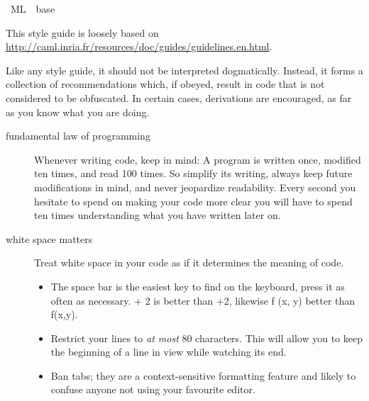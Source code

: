 %
\begin{isabellebody}%
\def\isabellecontext{ML}%
%
\isadelimtheory
\isanewline
\isanewline
\isanewline
%
\endisadelimtheory
%
\isatagtheory
{}\isamarkupfalse%
\ {\isachardoublequoteopen}ML{\isachardoublequoteclose}\ \ base\ %
\endisatagtheory
{\isafoldtheory}%
%
\isadelimtheory
%
\endisadelimtheory
%
\isamarkuptrue%
%
\begin{isamarkuptext}%
This style guide is loosely based on
  \url{http://caml.inria.fr/resources/doc/guides/guidelines.en.html}.

  Like any style guide, it should not be interpreted dogmatically.
  Instead, it forms a collection of recommendations which,
  if obeyed, result in code that is not considered to be
  obfuscated.  In certain cases, derivations are encouraged,
  as far as you know what you are doing.

  \begin{description}

    \item[fundamental law of programming]
      Whenever writing code, keep in mind: A program is
      written once, modified ten times, and read
      100 times.  So simplify its writing,
      always keep future modifications in mind,
      and never jeopardize readability. Every second you hesitate
      to spend on making your code more clear you will
      have to spend ten times understanding what you have
      written later on.

    \item[white space matters]
      Treat white space in your code as if it determines
      the meaning of code.

      \begin{itemize}

        \item The space bar is the easiest key to find on the keyboard,
          press it as often as necessary. { + 2} is better
          than {+2}, likewise {\ttfamily f (x, y)}
          better than {\ttfamily f(x,y)}.

        \item Restrict your lines to \emph{at most} 80 characters.
          This will allow you to keep the beginning of a line
          in view while watching its end.

        \item Ban tabs; they are a context-sensitive formatting
          feature and likely to confuse anyone not using your
          favourite editor.


\end{itemize}
\end{description}
\end{isamarkuptext}
\end{isabellebody}
